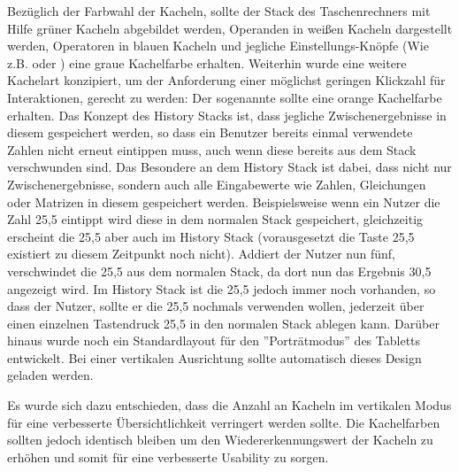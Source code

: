 Bezüglich der Farbwahl der Kacheln, sollte der Stack des Taschenrechners mit Hilfe grüner Kacheln abgebildet werden, Operanden in weißen Kacheln dargestellt werden, Operatoren in blauen Kacheln und jegliche Einstellungs-Knöpfe (Wie z.B.  oder ) eine graue Kachelfarbe erhalten. Weiterhin wurde eine weitere Kachelart konzipiert, um der Anforderung einer möglichst geringen Klickzahl für Interaktionen, gerecht zu werden: Der sogenannte  sollte eine orange Kachelfarbe erhalten. Das Konzept des History Stacks ist, dass jegliche Zwischenergebnisse in diesem gespeichert werden, so dass ein Benutzer bereits einmal verwendete Zahlen nicht erneut eintippen muss, auch wenn diese bereits aus dem Stack verschwunden sind. Das Besondere an dem History Stack ist dabei, dass nicht nur Zwischenergebnisse, sondern auch alle Eingabewerte wie Zahlen, Gleichungen oder Matrizen in diesem gespeichert werden. Beispielsweise wenn ein Nutzer die Zahl 25,5 eintippt wird diese in dem normalen Stack gespeichert, gleichzeitig erscheint die 25,5 aber auch im History Stack (vorausgesetzt die Taste 25,5 existiert zu diesem Zeitpunkt noch nicht). Addiert der Nutzer nun fünf, verschwindet die 25,5 aus dem normalen Stack, da dort nun das Ergebnis 30,5 angezeigt wird. Im History Stack ist die 25,5 jedoch immer noch vorhanden, so dass der Nutzer, sollte er die 25,5 nochmals verwenden wollen, jederzeit über einen einzelnen Tastendruck 25,5 in den normalen Stack ablegen kann. Darüber hinaus wurde noch ein Standardlayout für den ''Porträtmodus'' des Tabletts entwickelt. Bei einer vertikalen Ausrichtung sollte automatisch dieses Design geladen werden. 

Es wurde sich dazu entschieden, dass die Anzahl an Kacheln im vertikalen Modus für eine verbesserte Übersichtlichkeit verringert werden sollte. Die Kachelfarben sollten jedoch identisch bleiben um den Wiedererkennungswert der Kacheln zu erhöhen und somit für eine verbesserte Usability zu sorgen.

